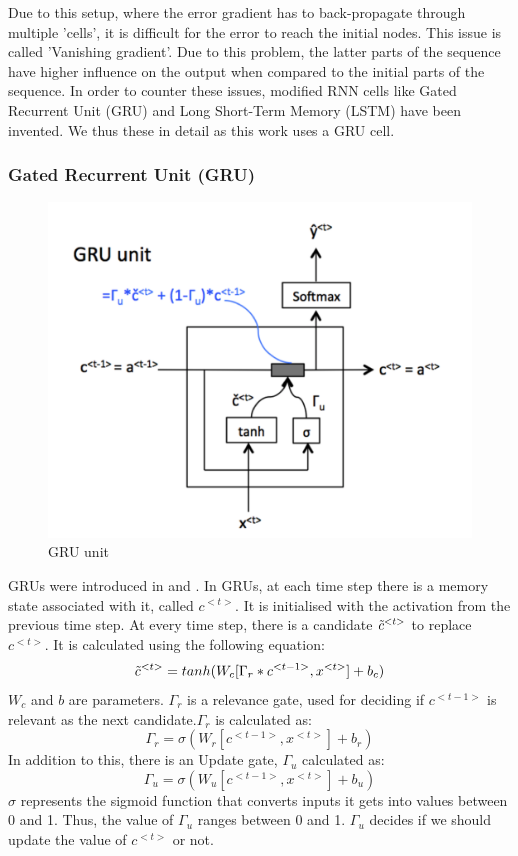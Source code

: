 Due to this setup, where the error gradient has to back-propagate through multiple 'cells', it is difficult for the error to reach the initial nodes. This issue is called 'Vanishing gradient'. Due to this problem, the latter parts of the sequence have higher influence on the output when compared to the initial parts of the sequence. In order to counter these issues, modified RNN cells like Gated Recurrent Unit (GRU) and Long Short-Term Memory (LSTM) have been invented. We thus these in detail as this work uses a GRU cell.
\subsubsection{Gated Recurrent Unit (GRU)}
 \begin{figure}[h]
    \centering
    \includegraphics[height=0.25\paperheight]{Figures/GRU_cell.png}
    \caption{GRU unit\cite{cavaioni_deeplearning_2018}}
    \label{fig:gru_unit}
\end{figure}
GRUs were introduced in \cite{cho_properties_2014} and \cite{chung_empirical_2014}.
In GRUs, at each time step there is a memory state associated with it, called \(c^{<t>}\). It is initialised with the activation from the previous time step. At every time step, there is a candidate \(\Tilde{c}^{<t>}\) to replace \(c^{<t>}\). It is calculated using the following equation:
\[\Tilde{c}^{<t>}=tanh(W_c[\Gamma_r*c^{<t-1>},x^{<t>}]+b_c)\]
\(W_c\) and \(b\) are parameters. \(\Gamma_r\) is a relevance gate, used for deciding if \(c^{<t-1>}\) is relevant as the next candidate.\(\Gamma_r\) is calculated as:
\[\Gamma_r = \sigma(W_r[c^{<t-1>},x^{<t>}]+b_r)\]
In addition to this, there is an Update gate, \(\Gamma_u\) calculated as:
\[\Gamma_u = \sigma(W_u[c^{<t-1>},x^{<t>}]+b_u)\]
 \(\sigma\) represents the sigmoid function that converts inputs it gets into values between 0 and 1. Thus, the value of \(\Gamma_u\) ranges between 0 and 1. \(\Gamma_u\) decides if we should update the value of \(c^{<t>}\) or not. 
 
